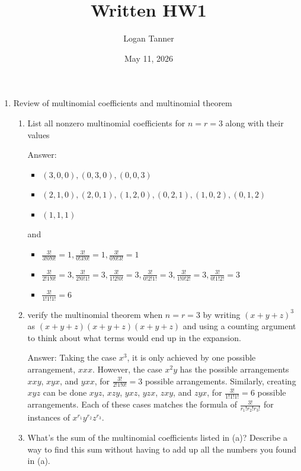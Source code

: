 \documentclass{article}
\title{Written HW1}
\author{Logan Tanner}
\date{May 11, 2026}
\begin{document}
\maketitle

\begin{enumerate}
    \item Review of multinomial coefficients and multinomial theorem

        \begin{enumerate}
            \item List all nonzero multinomial coefficients for $n = r = 3$ along with their values

                Answer:
                \begin{itemize}
                    \item $(3,0,0), (0,3,0), (0,0,3)$
                    \item $(2,1,0), (2,0,1), (1,2,0), (0,2,1), (1,0,2), (0,1,2)$
                    \item $(1,1,1)$
                \end{itemize}
                and
                \begin{itemize} 
                    \item $\frac{3!}{3!0!0!}=1,\frac{3!}{0!3!0!}=1,\frac{3!}{0!0!3!}=1$ 
                    \item $\frac{3!}{2!1!0!} = 3,\frac{3!}{2!0!1!} = 3,\frac{3!}{1!2!0!} = 3,\frac{3!}{0!2!1!} = 3,\frac{3!}{1!0!2!} = 3,\frac{3!}{0!1!2!} = 3$
                    \item $\frac{3!}{1!1!1!} = 6$
                \end{itemize}

            \item verify the multinomial theorem when $n = r = 3$ by writing $(x + y + z)^3$ as $(x + y + z)(x + y + z)(x + y + z)$ and using a counting argument to think about what terms would end up in the expansion. 

                Answer: 
                Taking the case $x^3$, it is only achieved by one possible arrangement, $xxx$. However, the case $x^2y$ has the possible arrangements $xxy$, $xyx$, and $yxx$, for $\frac{3!}{2!1!0!} = 3$ possible arrangements. Similarly, creating $xyz$ can be done $xyz$, $xzy$, $yxz$, $yzx$, $zxy$, and $zyx$, for $\frac{3!}{1!1!1!}=6$ possible arrangements. Each of these cases matches the formula of $\frac{3!}{r_1!r_2!r_3!}$ for instances of $x^{r_1}y^{r_2}z^{r_3}$.

            \item What's the sum of the multinomial coefficients listed in (a)? Describe a way to find this sum without having to add up all the numbers you found in (a).


\end{enumerate}
\end{enumerate}
\end{document}
